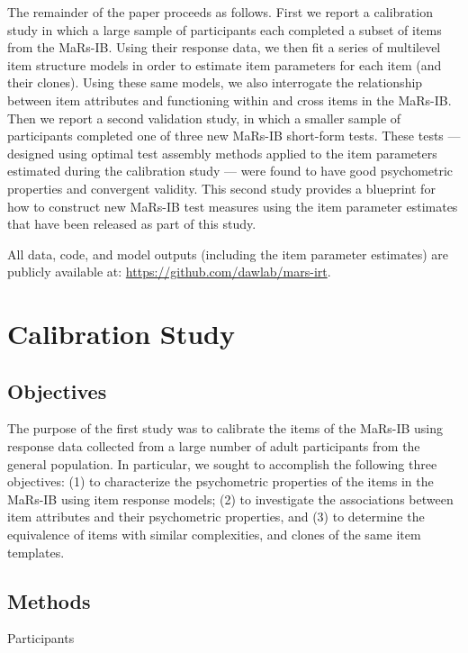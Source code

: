 \documentclass[a4paper,man,natbib]{apa6}
\makeatletter
\renewcommand{\subsubsection}{\@startsection{subsubsection}{3}
  {\z@}%
  {\b@level@two@skip}{\e@level@two@skip}%
  {\normalfont\normalsize\bfseries}}
\makeatother
\begin{document}
The remainder of the paper proceeds as follows. First we report a calibration study in which a large sample of participants each completed a subset of items from the MaRs-IB. Using their response data, we then fit a series of multilevel item structure models in order to estimate item parameters for each item (and their clones). Using these same models, we also interrogate the relationship between item attributes and functioning within and cross items in the MaRs-IB. Then we report a second validation study, in which a smaller sample of participants completed one of three new MaRs-IB short-form tests. These tests --- designed using optimal test assembly methods applied to the item parameters estimated during the calibration study --- were found to have good psychometric properties and convergent validity. This second study provides a blueprint for how to construct new MaRs-IB test measures using the item parameter estimates that have been released as part of this study.

All data, code, and model outputs (including the item parameter estimates) are publicly available at: \url{https://github.com/dawlab/mars-irt}.

\clearpage
\section{Calibration Study}

\subsection{Objectives}

The purpose of the first study was to calibrate the items of the MaRs-IB using response data collected from a large number of adult participants from the general population. In particular, we sought to accomplish the following three objectives: (1) to characterize the psychometric properties of the items in the MaRs-IB using item response models; (2) to investigate the associations between item attributes and their psychometric properties, and (3) to determine the equivalence of items with similar complexities, and clones of the same item templates. 

\subsection{Methods}

\subsubsection{Participants} 
\end{document}
